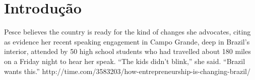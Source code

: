 \chapter{Introdução}
\label{cap-introducao}

Pesce believes the country is ready for the kind of changes she advocates, citing as evidence her recent speaking engagement in Campo Grande, deep in Brazil’s interior, attended by 50 high school students who had travelled about 180 miles on a Friday night to hear her speak. “The kids didn’t blink,” she said. “Brazil wants this.” http://time.com/3583203/how-entrepreneurship-is-changing-brazil/
